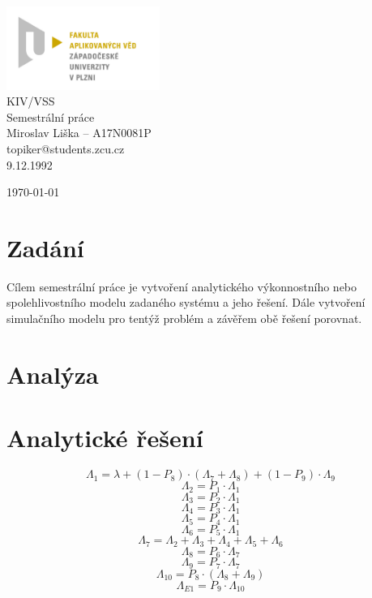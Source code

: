 \documentclass{article}
\begin{document}


\begin{titlepage}	
	\begin{center}
		\includegraphics[width=5cm]{logo.jpg}\\[3.5cm]
		{\Huge KIV/VSS}\\[0.5cm]
		{\Large Semestrální práce}\\[0.5cm]
		{\large  Miroslav Liška – A17N0081P}\\[0.5cm]
		{\large  topiker@students.zcu.cz}\\[0.5cm]
		{\large   9.12.1992}\\[0.5cm]
		\vfill

		{\large \today}

	\end{center}
\end{titlepage}



\section{Zadání} %
\setcounter{page}{1}
Cílem semestrální práce je vytvoření analytického výkonnostního nebo spolehlivostního modelu zadaného systému a jeho řešení. Dále vytvoření simulačního modelu pro tentýž problém a závěřem obě řešení porovnat.

\section{Analýza}

\section{Analytické řešení}

$$
\Lambda_1 = \lambda + (1 - P_{8}) \cdot (\Lambda_{7} + \Lambda_{8}) + (1 - P_{9}) \cdot \Lambda_{9}
$$
$$
\Lambda_{2} = P_1 \cdot \Lambda_{1} 
$$
$$
\Lambda_{3} = P_2 \cdot \Lambda_{1} 
$$
$$
\Lambda_{4} = P_3 \cdot \Lambda_{1} 
$$
$$
\Lambda_{5} = P_4 \cdot \Lambda_{1} 
$$
$$
\Lambda_{6} = P_5 \cdot \Lambda_{1} 
$$
$$
\Lambda_{7} = \Lambda_{2} + \Lambda_{3} + \Lambda_{4}  + \Lambda_{5} + \Lambda_{6} 
$$
$$
\Lambda_{8} = P_6 \cdot \Lambda_{7} 
$$
$$
\Lambda_{9} = P_7 \cdot \Lambda_{7} 
$$
$$
\Lambda_{10} = P_8 \cdot (\Lambda_{8} + \Lambda_{9}) 
$$
$$
\Lambda_{E1} = P_9 \cdot \Lambda_{10}
$$
\end{document}
